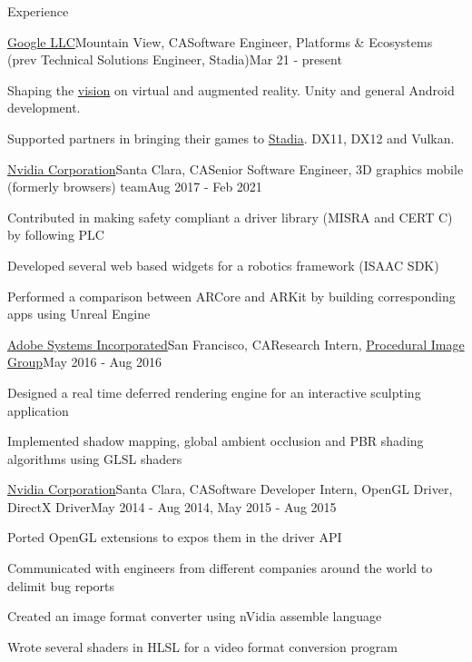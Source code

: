 \documentclass{resume} %
\begin{document}

\begin{rSection}{Experience}

\begin{rSubsection}{\href{http://about.google/}{Google LLC}}{Mountain View, CA}{Software Engineer, Platforms \& Ecosystems (prev Technical Solutions Engineer, Stadia)}{Mar 21 - present}
\item Shaping the \href{https://arvr.google.com/}{vision} on virtual and augmented reality. Unity and general Android development.
\item Supported partners in bringing their games to \href{http://stadia.google.com/}{Stadia}. DX11, DX12 and Vulkan.
\end{rSubsection}

\begin{rSubsection}{\href{http://www.nvidia.com}{Nvidia Corporation}}{Santa Clara, CA}{Senior Software Engineer, 3D graphics mobile (formerly browsers) team}{Aug 2017 - Feb 2021}
\item Contributed in making safety compliant a driver library (MISRA and CERT C) by following PLC
\item Developed several web based widgets for a robotics framework (ISAAC SDK)
\item Performed a comparison between ARCore and ARKit by building corresponding apps using Unreal Engine
\end{rSubsection}

\begin{rSubsection}{\href{http://www.adobe.com/}{Adobe Systems Incorporated}}{San Francisco, CA}{Research Intern, \href{http://research.adobe.com/}{Procedural Image Group}}{May 2016 - Aug 2016}
\item Designed a real time deferred rendering engine for an interactive sculpting application
\item Implemented shadow mapping, global ambient occlusion and PBR shading algorithms using GLSL shaders
\end{rSubsection}

\begin{rSubsection}{\href{http://www.nvidia.com}{Nvidia Corporation}}{Santa Clara, CA}{Software Developer Intern, OpenGL Driver, DirectX Driver}{May 2014 - Aug 2014, May 2015 - Aug 2015}
\item Ported OpenGL extensions to expos them in the driver API
\item Communicated with engineers from different companies around the world to delimit bug reports
\item Created an image format converter using nVidia assemble language
\item Wrote several shaders in HLSL for a video format conversion program
\end{rSubsection}


\end{rSection}
\end{document}
